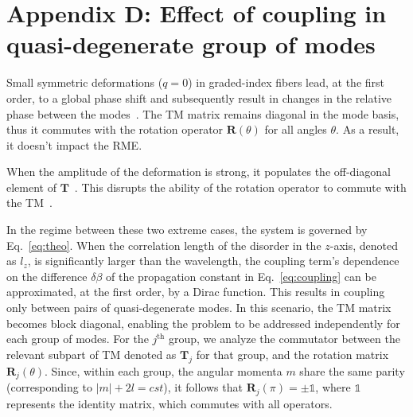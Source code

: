 \documentclass[aps,prl,twocolumn, amsmath,amssymb,superscriptaddress]{revtex4-2}
\begin{document}
\section*{Appendix D: Effect of coupling in quasi-degenerate group of modes}

Small symmetric deformations ($q=0$) in graded-index fibers
lead, at the first order, to a global phase shift and subsequently
result in changes in the relative phase between the modes~\cite{BoonzajerFlaes2018robustness}. 
The TM matrix remains diagonal in the mode basis, 
thus it commutes with the rotation operator $\mathbf{R}(\theta)$ 
for all angles $\theta$.
As a result, it doesn't impact the RME.

When the amplitude of the deformation is strong, 
it populates the off-diagonal element of $\mathbf{T}$~\cite{matthes2021learning}.
This disrupts the ability of the rotation operator to commute with the TM~\cite{Li2021memory}.

In the regime between these two extreme cases, 
the system is governed by Eq.~\ref{eq:theo}. 
When the correlation length of the disorder in the $z$-axis, denoted as $l_z$,
is significantly larger than the wavelength, 
the coupling term's dependence on the difference $\delta\beta$ 
of the propagation constant in Eq.~\ref{eq:coupling} can be approximated, 
at the first order, 
by a Dirac function. 
This results in coupling only between pairs of quasi-degenerate modes.
In this scenario, the TM matrix becomes block diagonal, 
enabling the problem to be addressed independently for each group of modes. 
For the $j^\text{th}$ group, we analyze the commutator between the relevant subpart of TM 
denoted as $\mathbf{T}_j$ for that group, 
and the rotation matrix $\mathbf{R}_j(\theta)$. 
Since, within each group, the angular momenta $m$ share the same parity 
(corresponding to $|m|+2l = cst$), 
it follows that $\mathbf{R}_j(\pi) = \pm \mathbb{1}$, 
where $\mathbb{1}$ represents the identity matrix, which commutes with all operators.
\end{document}
